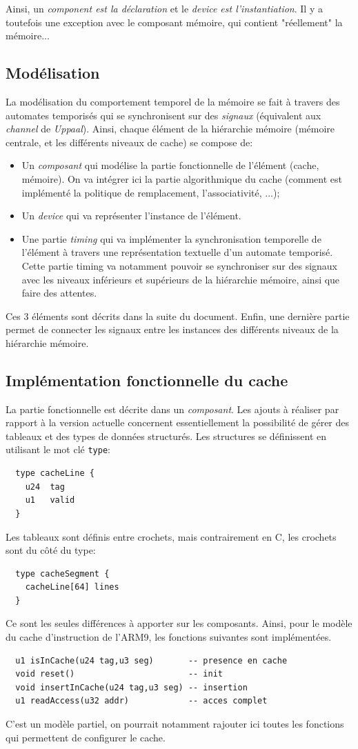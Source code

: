 \documentclass[11pt,a4paper]{article}
\begin{document}
Ainsi, un \emph{component est la déclaration} et le \emph{device est l'instantiation}. Il y a toutefois une exception avec le composant mémoire, qui contient "réellement" la mémoire...
 
\subsection{Modélisation}
La modélisation du comportement temporel de la mémoire se fait à travers des automates temporisés qui se synchronisent sur des \emph{signaux} (équivalent aux \emph{channel} de \emph{Uppaal}). Ainsi, chaque élément de la hiérarchie mémoire (mémoire centrale, et les différents niveaux de cache) se compose de:
\begin{itemize}
\item Un \emph{composant} qui modélise la partie fonctionnelle de l'élément (cache, mémoire). On va intégrer ici la partie algorithmique du cache (comment est implémenté la politique de remplacement, l'associativité, ...);
\item Un \emph{device} qui va représenter l'instance de l'élément.
\item Une partie \emph{timing} qui va implémenter la synchronisation temporelle de l'élément à travers une représentation textuelle d'un automate temporisé. Cette partie timing va notamment pouvoir se synchroniser sur des signaux avec les niveaux inférieurs et supérieurs de la hiérarchie mémoire, ainsi que faire des attentes.
\end{itemize}
Ces 3 éléments sont décrits dans la suite du document.
Enfin, une dernière partie permet de connecter les signaux entre les instances des différents niveaux de la hiérarchie mémoire.

\subsection{Implémentation fonctionnelle du cache}
La partie fonctionnelle est décrite dans un \emph{composant}. Les ajouts à réaliser par rapport à la version actuelle concernent essentiellement la possibilité de gérer des tableaux et des types de données structurés.
Les structures se définissent en utilisant le mot clé \texttt{type}:
\begin{lstlisting}
  type cacheLine {
    u24  tag
    u1   valid
  }
\end{lstlisting}
Les tableaux sont définis entre crochets, mais contrairement en C, les crochets sont du côté du type:
\begin{lstlisting}
  type cacheSegment {
    cacheLine[64] lines
  }
\end{lstlisting}
Ce sont les seules différences à apporter sur les composants. Ainsi, pour le modèle du cache d'instruction de l'ARM9, les fonctions suivantes sont implémentées.
\begin{lstlisting}
  u1 isInCache(u24 tag,u3 seg)       -- presence en cache
  void reset()                       -- init
  void insertInCache(u24 tag,u3 seg) -- insertion
  u1 readAccess(u32 addr)            -- acces complet
\end{lstlisting}
C'est un modèle partiel, on pourrait notamment rajouter ici toutes les fonctions qui permettent de configurer le cache.
\end{document}

